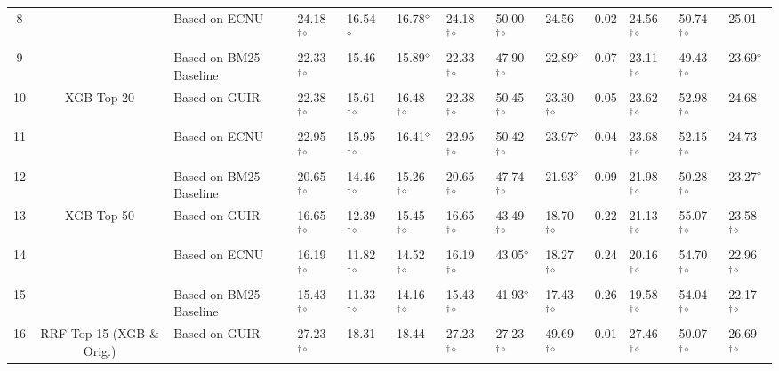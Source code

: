 \begin{table*}
{\begin{tabular}{cclllllllllll}
8  &  & Based on ECNU  & 24.18$^{\dagger\diamond}$  & 16.54 $^{\diamond}$  & 16.78$^{\diamond}$  & 24.18$^{\dagger\diamond}$  & 50.00$^{\dagger\diamond}$  & 24.56  & 0.02  & 24.56$^{\dagger\diamond}$  & 50.74$^{\dagger\diamond}$  & 25.01\tabularnewline
9  &  & Based on BM25 Baseline  & 22.33$^{\dagger\diamond}$  & 15.46  & 15.89$^{\diamond}$  & 22.33$^{\dagger\diamond}$  & 47.90$^{\dagger\diamond}$  & 22.89$^{\diamond}$  & 0.07  & 23.11$^{\dagger\diamond}$  & 49.43$^{\dagger\diamond}$  & 23.69$^{\diamond}$\tabularnewline
\midrule 
10  & \multirow{3}{*}{XGB Top 20} & Based on GUIR  & 22.38$^{\dagger\diamond}$  & 15.61$^{\dagger\diamond}$  & 16.48$^{\dagger\diamond}$  & 22.38$^{\dagger\diamond}$  & 50.45$^{\dagger\diamond}$  & 23.30$^{\dagger\diamond}$  & 0.05  & 23.62$^{\dagger\diamond}$  & 52.98$^{\dagger\diamond}$  & 24.68\tabularnewline
11  &  & Based on ECNU  & 22.95$^{\dagger\diamond}$  & 15.95$^{\dagger\diamond}$  & 16.41$^{\diamond}$  & 22.95$^{\dagger\diamond}$  & 50.42$^{\dagger\diamond}$  & 23.97$^{\diamond}$  & 0.04  & 23.68$^{\dagger\diamond}$  & 52.15$^{\dagger\diamond}$  & 24.73\tabularnewline
12  &  & Based on BM25 Baseline  & 20.65$^{\dagger\diamond}$  & 14.46$^{\dagger\diamond}$  & 15.26$^{\dagger\diamond}$  & 20.65$^{\dagger\diamond}$  & 47.74$^{\dagger\diamond}$  & 21.93$^{\diamond}$  & 0.09  & 21.98$^{\dagger\diamond}$  & 50.28$^{\dagger\diamond}$  & 23.27$^{\diamond}$\tabularnewline
\midrule 
13  & \multirow{3}{*}{XGB Top 50} & Based on GUIR  & 16.65$^{\dagger\diamond}$  & 12.39$^{\dagger\diamond}$  & 15.45$^{\dagger\diamond}$  & 16.65$^{\dagger\diamond}$  & 43.49$^{\dagger\diamond}$  & 18.70$^{\dagger\diamond}$  & 0.22  & 21.13$^{\dagger\diamond}$  & 55.07$^{\dagger\diamond}$  & 23.58$^{\dagger\diamond}$\tabularnewline
14  &  & Based on ECNU  & 16.19$^{\dagger\diamond}$  & 11.82$^{\dagger\diamond}$  & 14.52$^{\dagger\diamond}$  & 16.19$^{\dagger\diamond}$  & 43.05$^{\diamond}$  & 18.27$^{\dagger\diamond}$  & 0.24  & 20.16$^{\dagger\diamond}$  & 54.70$^{\dagger\diamond}$  & 22.96$^{\dagger\diamond}$\tabularnewline
15  &  & Based on BM25 Baseline  & 15.43$^{\dagger\diamond}$  & 11.33$^{\dagger\diamond}$  & 14.16$^{\dagger\diamond}$  & 15.43$^{\dagger\diamond}$  & 41.93$^{\diamond}$  & 17.43$^{\dagger\diamond}$  & 0.26  & 19.58$^{\dagger\diamond}$  & 54.04$^{\dagger\diamond}$  & 22.17$^{\dagger\diamond}$\tabularnewline
\midrule 
16  & \multirow{3}{*}{RRF Top 15 (XGB \& Orig.) } & Based on GUIR  & 27.23$^{\dagger\diamond}$  & 18.31  & 18.44  & 27.23$^{\dagger\diamond}$  & 27.23$^{\dagger\diamond}$  & 49.69$^{\dagger\diamond}$  & 0.01  & 27.46$^{\dagger\diamond}$  & 50.07$^{\dagger\diamond}$  & 26.69$^{\dagger\diamond}$\tabularnewline

\end{tabular}}
\end{table*}

